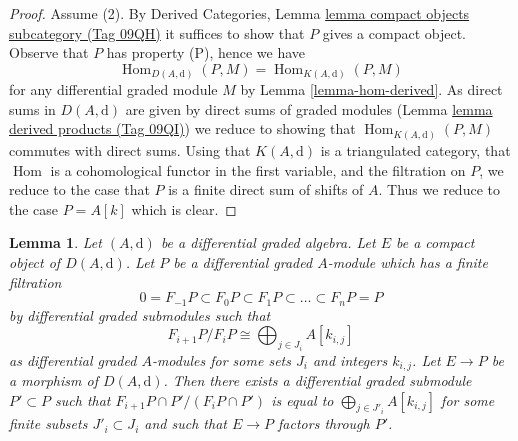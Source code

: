 \documentclass{amsart}
\theoremstyle{plain}
\newtheorem{lemma}[subsection]{Lemma}
\theoremstyle{definition}
\theoremstyle{remark}
\numberwithin{equation}{subsection}
\def\Hom{\mathop{\mathrm{Hom}}\nolimits}
\begin{document}
\begin{proof}
\medskip\noindent
Assume (2). By
Derived Categories, Lemma \href{https://stacks.math.columbia.edu/tag/09QH}{lemma compact objects subcategory (Tag 09QH)}
it suffices to show that $P$ gives a compact object. Observe that
$P$ has property (P), hence we have
$$
\Hom_{D(A, \text{d})}(P, M) = \Hom_{K(A, \text{d})}(P, M)
$$
for any differential graded module $M$ by Lemma \ref{lemma-hom-derived}.
As direct sums in $D(A, \text{d})$ are given by direct sums of
graded modules (Lemma \href{https://stacks.math.columbia.edu/tag/09QI}{lemma derived products (Tag 09QI)}) we reduce
to showing that $\Hom_{K(A, \text{d})}(P, M)$ commutes with direct
sums. Using that $K(A, \text{d})$ is a triangulated category,
that $\Hom$ is a cohomological functor in the first
variable, and the filtration on $P$, we reduce to the case that
$P$ is a finite direct sum of shifts of $A$. Thus we reduce to
the case $P = A[k]$ which is clear.
\end{proof}


\begin{lemma}
\label{lemma-factor-through-nicer}
Let $(A, \text{d})$ be a differential graded algebra. Let $E$ be a compact
object of $D(A, \text{d})$. Let $P$ be a differential graded $A$-module
which has a finite filtration
$$
0 = F_{-1}P \subset F_0P \subset F_1P \subset \ldots \subset F_nP = P
$$
by differential graded submodules such that
$$
F_{i + 1}P/F_iP \cong \bigoplus\nolimits_{j \in J_i} A[k_{i, j}]
$$
as differential graded $A$-modules for some sets $J_i$ and integers $k_{i, j}$.
Let $E \to P$ be a morphism of $D(A, \text{d})$.
Then there exists a differential graded submodule $P' \subset P$ such that
$F_{i + 1}P \cap P'/(F_iP \cap P')$ is equal to
$\bigoplus_{j \in J'_i} A[k_{i, j}]$ for some finite subsets
$J'_i \subset J_i$ and such that $E \to P$ factors through $P'$.
\end{lemma}
\end{document}
